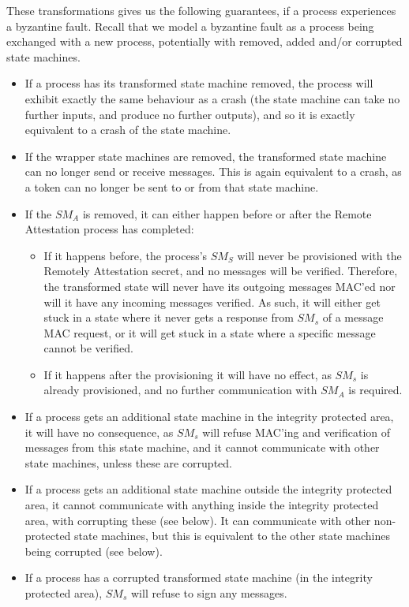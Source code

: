 \documentclass{article}
\begin{document}
	These transformations gives us the following guarantees, if a process experiences a byzantine fault.
	Recall that we model a byzantine fault as a process being exchanged with a new process, potentially with removed, added and/or corrupted state machines.
	\begin{itemize}
		\item If a process has its transformed state machine removed, the process will exhibit exactly the same behaviour as a crash (the state machine can take no further inputs, and produce no further outputs), and so it is exactly equivalent to a crash of the state machine.
		\item If the wrapper state machines are removed, the transformed state machine can no longer send or receive messages.
		This is again equivalent to a crash, as a token can no longer be sent to or from that state machine.
		\item If the $SM_A$ is removed, it can either happen before or after the Remote Attestation process has completed:
		\begin{itemize}
			\item If it happens before, the process's $SM_S$ will never be provisioned with the Remotely Attestation secret, and no messages will be verified.
			Therefore, the transformed state will never have its outgoing messages MAC'ed nor will it have any incoming messages verified.
			As such, it will either get stuck in a state where it never gets a response from $SM_s$ of a message MAC request, or it will get stuck in a state where a specific message cannot be verified.
			\item If it happens after the provisioning it will have no effect, as $SM_s$ is already provisioned, and no further communication with $SM_A$ is required.
		\end{itemize}
		\item If a process gets an additional state machine in the integrity protected area, it will have no consequence, as $SM_s$ will refuse MAC'ing and verification of messages from this state machine, and it cannot communicate with other state machines, unless these are corrupted.
		\item If a process gets an additional state machine outside the integrity protected area, it cannot communicate with anything inside the integrity protected area, with corrupting these (see below).
		It can communicate with other non-protected state machines, but this is equivalent to the other state machines being corrupted (see below).
		\item If a process has a corrupted transformed state machine (in the integrity protected area), $SM_s$ will refuse to sign any messages.

\end{itemize}
\end{document}
